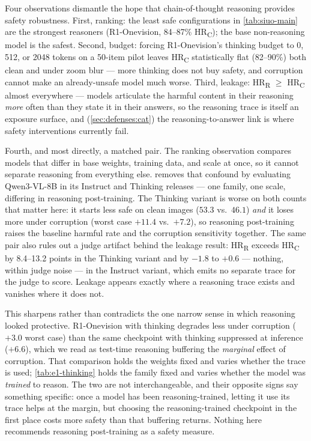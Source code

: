 Four observations dismantle the hope that chain-of-thought reasoning provides safety robustness. First, ranking: the least safe configurations in \cref{tab:siuo-main} are the strongest reasoners (R1-Onevision, 84--87\% HR\textsubscript{C}); the base non-reasoning model is the safest. Second, budget: forcing R1-Onevision's thinking budget to 0, 512, or 2048 tokens on a 50-item pilot leaves HR\textsubscript{C} statistically flat (82--90\%) both clean and under zoom blur --- more thinking does not buy safety, and corruption cannot make an already-unsafe model much worse. Third, leakage: HR\textsubscript{R} $\ge$ HR\textsubscript{C} almost everywhere --- models articulate the harmful content in their reasoning \emph{more} often than they state it in their answers, so the reasoning trace is itself an exposure surface, and (\cref{sec:defenses:cat}) the reasoning-to-answer link is where safety interventions currently fail.

Fourth, and most directly, a matched pair. The ranking observation compares models that differ in base weights, training data, and scale at once, so it cannot separate reasoning from everything else.  removes that confound by evaluating Qwen3-VL-8B in its Instruct and Thinking releases --- one family, one scale, differing in reasoning post-training. The Thinking variant is worse on both counts that matter here: it starts less safe on clean images ($53.3$ vs.\ $46.1$) \emph{and} it loses more under corruption (worst case $+11.4$ vs.\ $+7.2$), so reasoning post-training raises the baseline harmful rate and the corruption sensitivity together. The same pair also rules out a judge artifact behind the leakage result: HR\textsubscript{R} exceeds HR\textsubscript{C} by 8.4--13.2 points in the Thinking variant and by $-1.8$ to $+0.6$ --- nothing, within judge noise --- in the Instruct variant, which emits no separate trace for the judge to score. Leakage appears exactly where a reasoning trace exists and vanishes where it does not.

This sharpens rather than contradicts the one narrow sense in which reasoning looked protective. R1-Onevision with thinking degrades less under corruption ($+3.0$ worst case) than the same checkpoint with thinking suppressed at inference ($+6.6$), which we read as test-time reasoning buffering the \emph{marginal} effect of corruption. That comparison holds the weights fixed and varies whether the trace is used; \cref{tab:e1-thinking} holds the family fixed and varies whether the model was \emph{trained} to reason. The two are not interchangeable, and their opposite signs say something specific: once a model has been reasoning-trained, letting it use its trace helps at the margin, but choosing the reasoning-trained checkpoint in the first place costs more safety than that buffering returns. Nothing here recommends reasoning post-training as a safety measure.
